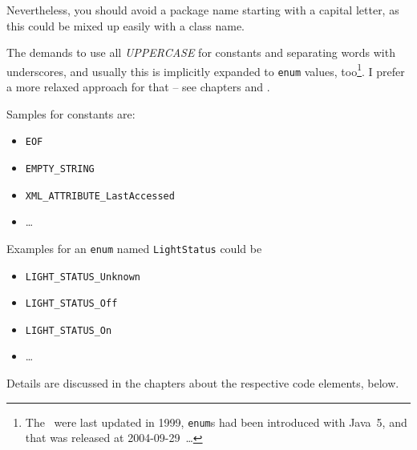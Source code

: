 Nevertheless, you should avoid a package name starting with a capital letter, as this could be mixed up easily with a class name.

The \ccjpl demands to use all \textit{UPPERCASE} for constants and separating words with underscores, and usually this is implicitly expanded to \lstinline|enum| values, too\footnote{The \ccjpl ~were last updated in 1999, \lstinline|enum|s had been introduced with Java~5, and that was released at 2004-09-29~…}. I prefer a more relaxed approach for that – see chapters  and .

Samples for constants are:
\begin{itemize}[nosep]
	\item{\lstinline|EOF|}
	\item{\lstinline|EMPTY_STRING|}
	\item{\lstinline|XML_ATTRIBUTE_LastAccessed|}
	\item{…}
\end{itemize}

Examples for an \lstinline|enum| named \lstinline|LightStatus| could be
\begin{itemize}[nosep]
	\item{\lstinline|LIGHT_STATUS_Unknown|}
	\item{\lstinline|LIGHT_STATUS_Off|}
	\item{\lstinline|LIGHT_STATUS_On|}
	\item{…}
\end{itemize}

Details are discussed in the chapters about the respective code elements, below.


